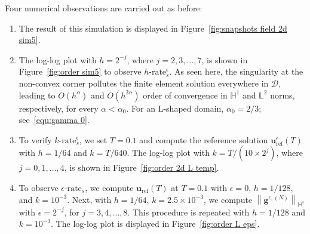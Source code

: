 \documentclass[11pt,reqno]{amsart}
\theoremstyle{definition}
\numberwithin{equation}{section}
\newcommand{\bff}{\boldsymbol}
\newcommand{\bb}{\mathbb}
\newcommand{\norm}[2]{\left\|{#1}\right\|_{#2}}
\begin{document}
{
Four numerical observations are carried out as before:
\begin{enumerate}
    \item[(O1)] The result of this simulation is displayed in Figure~\ref{fig:snapshots field 2d sim5}.

    \item[(O2)] The log-log plot with $h=2^{-j}$, where $j=2,3,\ldots,7$, is shown in Figure~\ref{fig:order sim5} to observe $h\text{-rate}_s^\epsilon$. As seen here, the singularity at the non-convex corner pollutes the finite element solution everywhere in $\mathscr{D}$, leading to $O(h^\alpha)$ and $O(h^{2\alpha})$ order of convergence in $\bb{H}^1$ and $\bb{L}^2$ norms, respectively, for every $\alpha<\alpha_0$. For an L-shaped domain, $\alpha_0=2/3$; see~\eqref{equ:gamma 0}.

    \item[(O3)] To verify $k\text{-rate}^\epsilon_s$, we set $T=0.1$ and compute the reference solution $\bff{u}^\epsilon_{\mathrm{ref}}(T)$ with $h=1/64$ and $k=T/640$. The log-log plot with $k=T/(10\times 2^j)$, where $j=0,1,\ldots,4$, is shown in Figure~\ref{fig:order 2d L temp}.

    \item[(O4)] To observe $\epsilon\text{-rate}_s$, we compute $\bff{u}_\mathrm{ref}(T)$ at $T=0.1$ with $\epsilon=0$, $h=1/128$, and $k=10^{-3}$. Next, with $h=1/64$, $k=2.5\times 10^{-3}$, we compute $\norm{\bff{g}^{\epsilon, (N)}}{\bb{H}^s}$ with $\epsilon=2^{-j}$, for $j=3,4,\ldots, 8$. This procedure is repeated with $h=1/128$ and $k=10^{-3}$. The log-log plot is displayed in Figure~\ref{fig:order L eps}.
\end{enumerate}
}
\end{document}
